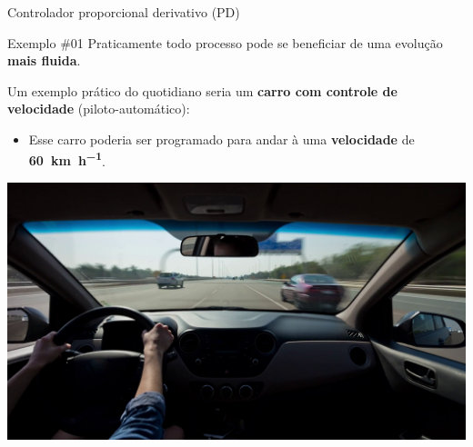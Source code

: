 \begin{frame}{Controlador proporcional derivativo (PD)}
	\begin{block}{Exemplo \#01}
		Praticamente todo processo pode se beneficiar de uma evolução \textbf{mais fluida}.
		
		\smallskip
		
		Um exemplo prático do quotidiano seria um \textbf{carro com controle de velocidade} (piloto-automático):
		\begin{itemize}
			\item Esse carro poderia ser programado para andar à uma \textbf{velocidade} de \textbf{\SI{60}{\kilo\meter\per\hour}}.
		\end{itemize}
	\end{block}
	
	
	\centering
	\includegraphics[height=0.45\textheight]{Figuras/Ch12/fig9}
	
\end{frame}


